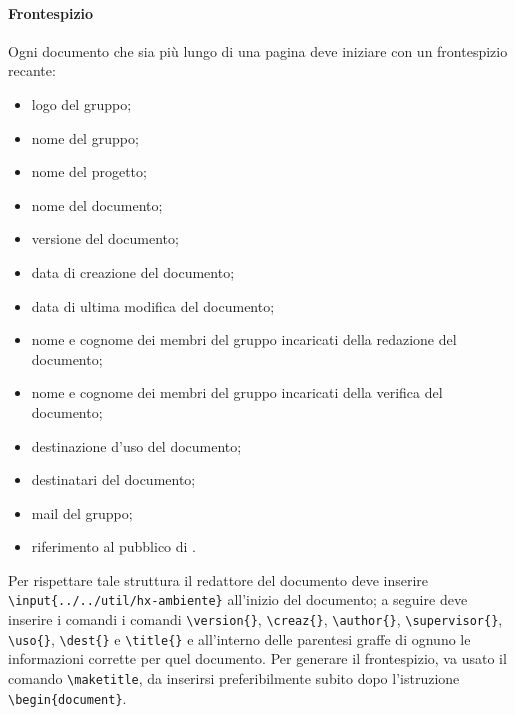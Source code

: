 \paragraph{Frontespizio} Ogni documento che sia più lungo di una pagina deve iniziare con un frontespizio recante: 
\begin{itemize}
	\item logo del gruppo;
	\item nome del gruppo;
	\item nome del progetto;
	\item nome del documento;
	\item versione del documento;
	\item data di creazione del documento;
	\item data di ultima modifica del documento;
	\item nome e cognome dei membri del gruppo incaricati della redazione del documento;
	\item nome e cognome dei membri del gruppo incaricati della verifica del documento;
	\item destinazione d'uso del documento;
	\item destinatari del documento;
	\item mail del gruppo;
	\item riferimento al  pubblico di .
\end{itemize} 
Per rispettare tale struttura il redattore del documento deve inserire \\\texttt{\textbackslash input\{../../util/hx-ambiente\}} all'inizio del documento; a seguire deve inserire i comandi i comandi \texttt{\textbackslash version\{\}}, \texttt{\textbackslash creaz\{\}}, \texttt{\textbackslash author\{\}}, \texttt{\textbackslash supervisor\{\}}, \texttt{\textbackslash uso\{\}}, \texttt{\textbackslash dest\{\}} e \texttt{\textbackslash title\{\}} e all'interno delle parentesi graffe di ognuno le informazioni corrette per quel documento. Per generare il frontespizio, va usato il comando \texttt{\textbackslash maketitle}, da inserirsi preferibilmente subito dopo l'istruzione \texttt{\textbackslash begin\{document\}}.

